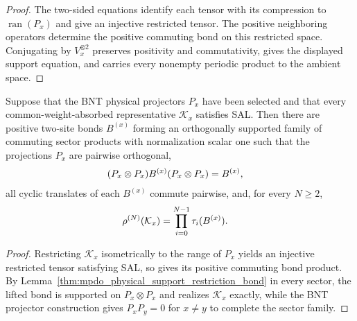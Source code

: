 \begin{proof}\leanok
    The two-sided equations identify each tensor with its compression to
    $\operatorname{ran}(P_x)$ and give an injective restricted tensor.
    The positive neighboring operators determine the positive commuting bond
    on this restricted space. Conjugating by $V_x^{\otimes2}$ preserves
    positivity and commutativity, gives the displayed support equation, and
    carries every nonempty periodic product to the ambient space.
\end{proof}

\begin{lemma}
    \label{thm:mpdo_bnt_sector_sal_commuting_family}
    \leanok
    Suppose that the BNT physical projectors $P_x$ have been selected and
    that every common-weight-absorbed representative $\mathcal K_x$
    satisfies SAL. Then there are positive two-site bonds $B^{(x)}$ forming an
    orthogonally supported family of commuting sector products with
    normalization scalar one such that the projections $P_x$ are pairwise
    orthogonal,
    \begin{align}
        (P_x\otimes P_x)B^{(x)}(P_x\otimes P_x)
         & =B^{(x)},
        \notag
    \end{align}
    all cyclic translates of each $B^{(x)}$ commute pairwise, and, for every
    $N\geq2$,
    \begin{align}
        \rho^{(N)}(\mathcal K_x)
         & =\prod_{i=0}^{N-1}\tau_i(B^{(x)}).
        \notag
    \end{align}
\end{lemma}

\begin{proof}\leanok
    Restricting $\mathcal K_x$ isometrically to the range of $P_x$ yields an
    injective restricted tensor satisfying SAL, so
    \cite[Proposition~C.8]{Cirac2016MPDO_arXiv} gives its positive commuting
    bond product. By Lemma~\ref{thm:mpdo_physical_support_restriction_bond}
    in every sector, the lifted bond is supported on $P_x\otimes P_x$ and
    realizes $\mathcal K_x$ exactly, while the BNT projector construction gives
    $P_xP_y=0$ for $x\ne y$ to complete the sector family.
\end{proof}

